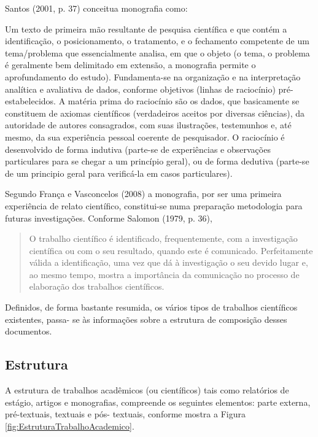 \documentclass[a4paper,12pt]{article}  %
\begin{document}
\begin{ElementosTextuais}
\begin{Desenvolvimento}
Santos (2001, p. 37) conceitua monografia como:
\begin{citacaodireta}
Um texto de primeira mão resultante de pesquisa científica e que contém a identificação, o posicionamento, o tratamento, e o fechamento competente de um tema/problema que essencialmente analisa, em que o objeto (o tema, o problema é geralmente bem delimitado em extensão, a monografia permite o aprofundamento do estudo). Fundamenta-se na organização e na interpretação analítica e avaliativa de dados, conforme objetivos (linhas de raciocínio) pré-estabelecidos. A matéria prima do raciocínio são os dados, que basicamente se constituem de axiomas científicos (verdadeiros aceitos por diversas ciências), da autoridade de autores consagrados, com suas ilustrações, testemunhos e, até mesmo, da sua experiência pessoal coerente de pesquisador. O raciocínio é desenvolvido de forma indutiva (parte-se de experiências e observações particulares para se chegar a um princípio geral), ou de forma dedutiva (parte-se de um principio geral para verificá-la em casos particulares).
\end{citacaodireta}

Segundo França e Vasconcelos (2008) a monografia, por ser uma primeira experiência de relato científico, constitui-se numa preparação metodologia para futuras investigações. Conforme Salomon (1979, p. 36),

\begin{quotation}
O trabalho científico é identificado, frequentemente, com a investigação científica ou com o seu resultado, quando este é comunicado. Perfeitamente válida a identificação, uma vez que dá à investigação o seu devido lugar e, ao mesmo tempo, mostra a importância da comunicação no processo de elaboração dos trabalhos científicos.
\end{quotation}

Definidos, de forma bastante resumida, os vários tipos de trabalhos científicos existentes, passa- se às informações sobre a estrutura de composição desses documentos.

\subsection{Estrutura}
A estrutura de trabalhos acadêmicos (ou científicos) tais como relatórios de estágio, artigos e monografias, compreende os seguintes elementos: parte externa, pré-textuais, textuais e pós- textuais, conforme mostra a Figura \ref{fig:EstruturaTrabalhoAcademico}.


\end{Desenvolvimento}
\end{ElementosTextuais}
\end{document}
